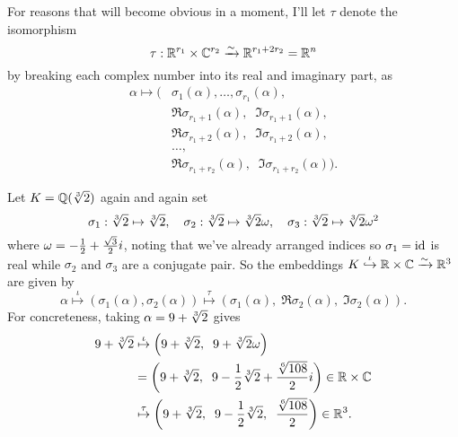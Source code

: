 For reasons that will become obvious in a moment, I'll let $\tau$ denote the isomorphism
\[
	\tau : \mathbb R^{r_1} \times \mathbb C^{r_2} \xrightarrow{\sim} \mathbb R^{r_1+2r_2} = \mathbb R^n
\]
by breaking each complex number into its real and imaginary part, as
\begin{align*}
\alpha \mapsto  \big(& \sigma_1(\alpha), \dots, \sigma_{r_1}(\alpha), \\
& \Re \sigma_{r_1+1}(\alpha), \;\; \Im \sigma_{r_1+1}(\alpha), \\
& \Re \sigma_{r_1+2}(\alpha), \;\; \Im \sigma_{r_1+2}(\alpha), \\
& \dots, \\
& \Re \sigma_{r_1+r_2}(\alpha), \;\; \Im \sigma_{r_1+r_2}(\alpha) \big). 
\end{align*}
\begin{example}
	Let $K = \mathbb Q(\sqrt[3]{2})$ again and again set
	\[ \sigma_1 : \sqrt[3]{2} \mapsto \sqrt[3]{2},
		\quad
		\sigma_2 : \sqrt[3]{2} \mapsto \sqrt[3]{2} \omega,
		\quad
		\sigma_3 : \sqrt[3]{2} \mapsto \sqrt[3]{2} \omega^2 \]
	where $\omega = - \frac{1}{2} + \frac{\sqrt3}{2} i$,
	noting that we've already arranged indices so $\sigma_1 = \mathrm{id}$ is real
	while $\sigma_2$ and $\sigma_3$ are a conjugate pair.
	So the embeddings $K \overset\iota{\hookrightarrow} \mathbb R \times \mathbb C \xrightarrow{\sim} \mathbb R^3$ are given by
	\[
		\alpha \overset\iota\longmapsto \left( \sigma_1(\alpha), \sigma_2(\alpha) \right)
		\overset\tau\longmapsto \left( \sigma_1(\alpha), \; \Re\sigma_2(\alpha), \; \Im\sigma_2(\alpha)  \right). \]
	For concreteness, taking $\alpha = 9 + \sqrt[3]{2}$ gives
	\begin{align*}
		9 + \sqrt[3]{2} &\overset\iota\mapsto
		\left( 9 + \sqrt[3]{2}, \;\; 9 + \sqrt[3]{2}\omega \right) \\
		&= \left( 9 + \sqrt[3]{2}, \;\;
		9 - \frac{1}{2}\sqrt[3]{2} + \frac{\sqrt[6]{108}}{2} i  \right) \in \mathbb R \times \mathbb C \\
		&\overset\tau\mapsto \left( 9 + \sqrt[3]{2}, \;\; 9 - \frac{1}{2} \sqrt[3]{2},
		\;\; \frac{\sqrt[6]{108}}{2}  \right) \in \mathbb R^3.
	\end{align*}
\end{example}

